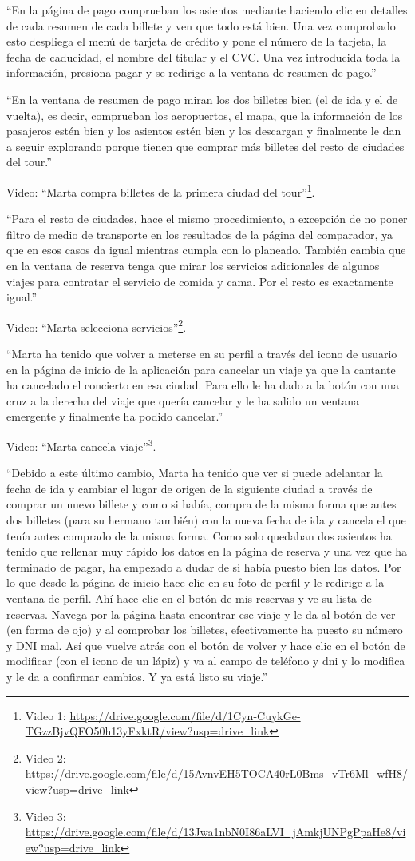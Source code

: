 ``En la página de pago comprueban los asientos mediante haciendo clic en detalles de cada resumen de cada billete y ven que todo está bien. Una vez comprobado esto despliega el menú de tarjeta de crédito y pone el número de la tarjeta, la fecha de caducidad, el nombre del titular y el CVC. Una vez introducida toda la información, presiona pagar y se redirige a la ventana de resumen de pago.''

``En la ventana de resumen de pago miran los dos billetes bien (el de ida y el de vuelta), es decir, comprueban los aeropuertos, el mapa, que la información de los pasajeros estén bien y los asientos estén bien y los descargan y finalmente le dan a seguir explorando porque tienen que comprar más billetes del resto de ciudades del tour.''

Video: ``Marta compra billetes de la primera ciudad del tour''\footnote{Video 1: \url{https://drive.google.com/file/d/1Cyn-CuykGe-TGzzBjvQFO50h13yFxktR/view?usp=drive_link}}.

``Para el resto de ciudades, hace el mismo procedimiento, a excepción de no poner filtro de medio de transporte en los resultados de la página del comparador, ya que en esos casos da igual mientras cumpla con lo planeado. También cambia que en la ventana de reserva tenga que mirar los servicios adicionales de algunos viajes para contratar el servicio de comida y cama. Por el resto es exactamente igual.''

Video: ``Marta selecciona servicios''\footnote{Video 2: \url{https://drive.google.com/file/d/15AvnvEH5TOCA40rL0Bms_vTr6Ml_wfH8/view?usp=drive_link}}.

``Marta ha tenido que volver a meterse en su perfil a través del icono de usuario en la página de inicio de la aplicación para cancelar un viaje ya que la cantante ha cancelado el concierto en esa ciudad. Para ello le ha dado a la botón con una cruz a la derecha del viaje que quería cancelar y le ha salido un ventana emergente y finalmente ha podido cancelar.''

Video: ``Marta cancela viaje''\footnote{Video 3: \url{https://drive.google.com/file/d/13Jwa1nbN0I86aLVI_jAmkjUNPgPpaHe8/view?usp=drive_link}}.

``Debido a este último cambio, Marta ha tenido que ver si puede adelantar la fecha de ida y cambiar el lugar de origen de la siguiente ciudad a través de comprar un nuevo billete y como si había, compra de la misma forma que antes dos billetes (para su hermano también) con la nueva fecha de ida y cancela el que tenía antes comprado de la misma forma. Como solo quedaban dos asientos ha tenido que rellenar muy rápido los datos en la página de reserva y una vez que ha terminado de pagar, ha empezado a dudar de si había puesto bien los datos. Por lo que desde la página de inicio hace clic en su foto de perfil y le redirige a la ventana de perfil. Ahí hace clic en el botón de mis reservas y ve su lista de reservas. Navega por la página hasta encontrar ese viaje y le da al botón de ver (en forma de ojo) y al comprobar los billetes, efectivamente ha puesto su número y DNI mal. Así que vuelve atrás con el botón de volver y hace clic en el botón de modificar (con el icono de un lápiz) y va al campo de teléfono y dni y lo modifica y le da a confirmar cambios. Y ya está listo su viaje.''

